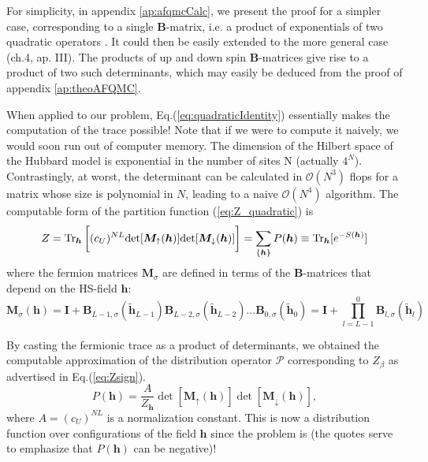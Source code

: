 For simplicity, in appendix \ref{ap:afqmcCalc}, we present the proof for a simpler case, corresponding to a single $\bm B$-matrix, i.e. a product of exponentials of two quadratic operators \cite{hirsch_two-dimensional_1985}.
It could then be easily extended to the more general case \cite{hanke_electronic_nodate}(ch.4, ap. III).
The products of up and down spin $\bm B$-matrices give rise to a product of two such determinants, which may easily be deduced from the proof of appendix \ref{ap:theoAFQMC}.

When applied to our problem, Eq.(\ref{eq:quadraticIdentity}) essentially makes the computation of the trace possible! Note that if we were to compute it naively, we would soon run out of computer memory.
The dimension of the Hilbert space of the Hubbard model is exponential in the number of sites N (actually $4^N$).
Contrastingly, at worst, the determinant can be calculated in $\mathcal{O}(N^3)$ flops for a matrix whose size is polynomial in $N$, leading to a naive $\mathcal{O}(N^4)$ algorithm.
The computable form of the partition function (\ref{eq:Z_quadratic}) is
\begin{equation}\label{eq:effectiveDensityMatrix}
Z =  \operatorname{Tr}_{\bm h} \bigg[ (c_U)^{NL} \text{det} [ \bm M_\uparrow (\bm h)] \text{det} [  \bm M_\downarrow (\bm h) ] \bigg] = \sum_{\{ \bm h \} } P ( \bm h ) \equiv \operatorname{Tr}_{\bm h} [ e^{-S(\bm h) } ]
\end{equation}
where the fermion matrices $\bm M_\sigma$ are defined in terms of the $\bm B$-matrices that depend on the HS-field $\bm h$:
\begin{equation}
\bm M_\sigma (\bm h) = \bm I + \bm B_{L-1,\sigma} ( \widetilde{\bm h}_{L-1}) \bm B_{L-2,\sigma} ( \widetilde{\bm h}_{L-2}) ... \bm B_{0,\sigma} ( \widetilde{\bm h}_0) = \bm I + \prod_{l= L -1}^0 \bm B_{l,\sigma} ( \widetilde{\bm h}_l )
\end{equation}

By casting the fermionic trace as a product of determinants, we obtained the computable approximation of the distribution operator $\mathcal{P}$ corresponding to $Z_{\beta}$ as advertised in Eq.(\ref{eq:Zsign}).
\begin{equation}
P(\bm h) = \frac{A}{Z_{\bm h}} \det [ \bm M_{\uparrow}(\bm h) ] \det [ \bm M_{\downarrow}(\bm h) ] ,
\end{equation}
where $A = (c_U)^{NL}$ is a normalization constant.
This is now a distribution function over configurations of the field $\bm h$ since the problem is  (the quotes serve to emphasize that $P (\bm h )$ can be negative)!

